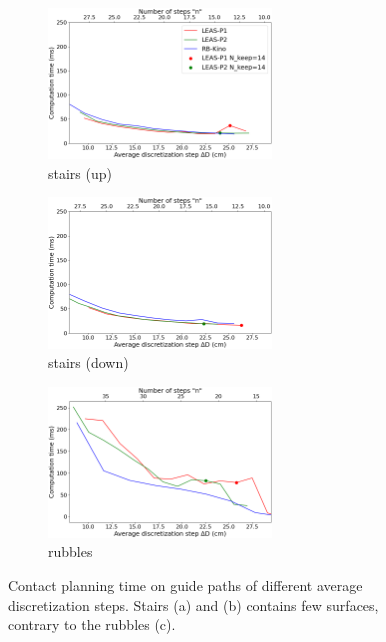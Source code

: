 \begin{figure}[h!]
    \centering
    \captionsetup[subfigure]{justification=centering}
    \begin{subfigure}[t]{0.32\linewidth}
    \includegraphics[trim={0cm 0cm 0cm 0cm}, clip,width=\textwidth, height=4cm]{Figures/Chapter_MIP_SL1M/res_mip/time_stairs.png}
    \caption{stairs (up)}
    \label{fig:mip:minimizing_basic:time:0}
    \end{subfigure}
    \begin{subfigure}[t]{0.32\linewidth}
    \includegraphics[trim={0cm 0cm 0cm 0cm}, clip,width=\textwidth, height=4cm]{Figures/Chapter_MIP_SL1M/res_mip/time_stairs_down.png}
    \caption{stairs (down)}
    \label{fig:mip:minimizing_basic:time:1}
    \end{subfigure}
    \begin{subfigure}[t]{0.32\linewidth}
    \includegraphics[trim={0cm 0cm 0cm 0cm}, clip,width=\textwidth, height=4cm]{Figures/Chapter_MIP_SL1M/res_mip/time_rubbles.png}
    \caption{rubbles}
    \label{fig:mip:minimizing_basic:time:2}
    \end{subfigure}
    \caption{Contact planning time on guide paths of different average discretization steps. Stairs (a) and (b) contains few surfaces, contrary to the rubbles (c).}
    \label{fig:mip:minimizing_basic:time}
\end{figure}

